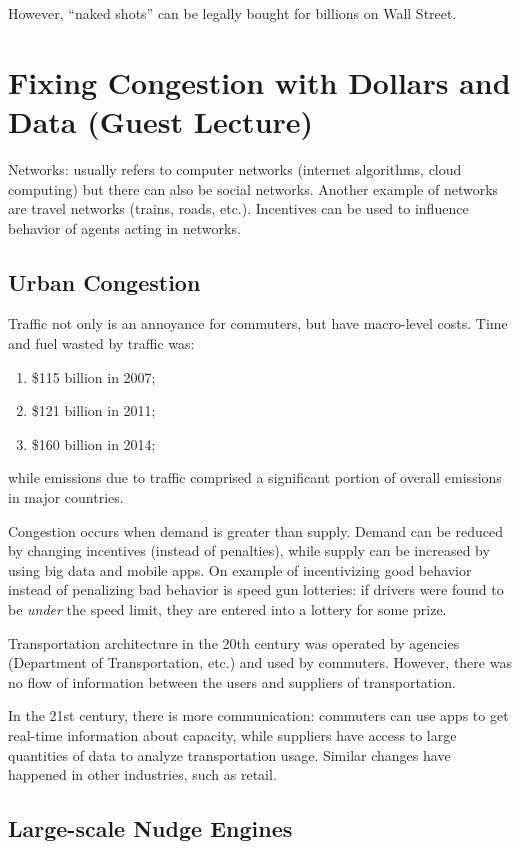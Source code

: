 \documentclass[dvipsnames]{article}
\theoremstyle{definition}
\theoremstyle{remark}
\begin{document}
However, ``naked shots'' can be legally bought for billions on Wall Street.

\newpage

\section{Fixing Congestion with Dollars and Data (Guest Lecture)}
Networks: usually refers to computer networks (internet algorithms, cloud computing) but there can also be social networks. Another example of networks are travel networks (trains, roads, etc.). Incentives can be used to influence behavior of agents acting in networks.

\subsection{Urban Congestion}

Traffic not only is an annoyance for commuters, but have macro-level costs. Time and fuel wasted by traffic was:
\begin{enumerate}
	\item \$115 billion in 2007;
	\item \$121 billion in 2011;
	\item \$160 billion in 2014;
\end{enumerate}
while emissions due to traffic comprised a significant portion of overall emissions in major countries. 

Congestion occurs when demand is greater than supply. Demand can be reduced by changing incentives (instead of penalties), while supply can be increased by using big data and mobile apps. On example of incentivizing good behavior instead of penalizing bad behavior is speed gun lotteries: if drivers were found to be \textit{under} the speed limit, they are entered into a lottery for some prize.

Transportation architecture in the 20th century was operated by agencies (Department of Transportation, etc.) and used by commuters. However, there was no flow of information between the users and suppliers of transportation.

In the 21st century, there is more communication: commuters can use apps to get real-time information about capacity, while suppliers have access to large quantities of data to analyze transportation usage. Similar changes have happened in other industries, such as retail.

\subsection{Large-scale Nudge Engines}
\end{document}
